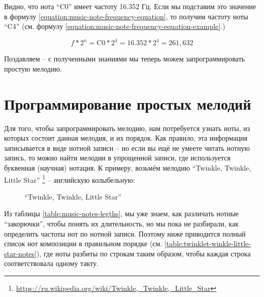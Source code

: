 \documentclass[a4paper,twoside]{book}
\newcounter{example-counter}
\begin{document}
Видно, что нота ``C0'' имеет частоту 16.352 Гц. Если мы подставим это значение в
формулу \ref{equation:music-note-frequency-equation}, то получим частоту ноты
``C4'' (см. формулу \ref{equation:music-note-frequency-equation-example}.)

\begin{equation}
  f * 2^n = \mbox{C0} * 2^4 = 16.352 * 2^4 = 261,632
  \label{equation:music-note-frequency-equation-example}
\end{equation}

Поздавляем -- с полученными знаниями мы теперь можем запрограммировать простую
мелодию.

\section{Программирование простых мелодий}

Для того, чтобы запрограммировать мелодию, нам потребуется узнать ноты, из
которых состоит данная мелодия, и их порядок. Как правило, эта информация
записывается в виде нотной записи -- но если вы ещё не умеете читать нотную
запись, то можно найти мелодии в упрощенной записи, где используется буквенная
(научная) нотация. К примеру, возьмём мелодию ``Twinkle, Twinkle, Little
Star'' \footnote{\url{https://ru.wikipedia.org/wiki/Twinkle,_Twinkle,_Little_Star}}
-- английскую колыбельную:

\begin{figure}[ht]
  \caption{``Twinkle, Twinkle, Little Star''}
  \centering
  \label{fig:sound-fig-3}
\end{figure}

Из таблицы \ref{table:music-notes-legths}, мы уже знаем, как различать нотные
``закорючки'', чтобы понять их длительность, но мы пока не разбирали, как
определить частоты нот по нотной записи. Поэтому ниже приводится полный список
нот композиции в правильном порядке (см.
\ref{table:twinklet-winkle-little-star-notes}), где ноты разбиты по строкам
таким образом, чтобы каждая строка соответствовала одному такту.
\end{document}
